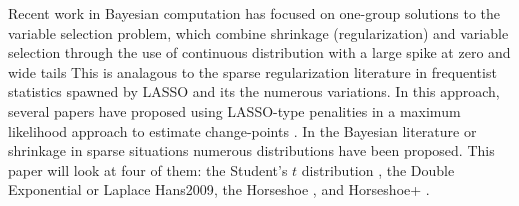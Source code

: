 Recent work in Bayesian computation has focused on one-group solutions to the variable selection problem, which combine shrinkage (regularization) and variable selection through the use of continuous distribution with a large spike at zero and wide tails \parencite{}
This is analagous to the sparse regularization literature in frequentist statistics spawned by LASSO \parencite{Tibshirani1996} and its the numerous variations.
In this approach, several papers have proposed using LASSO-type penalities in a maximum likelihood approach to estimate change-points \parencites{TibshiraniEtAl2005}{HarchaouiLevy-Leduc2010}{ChanYauZhang2014}.
In the Bayesian literature or shrinkage in sparse situations numerous distributions have been proposed. 
This paper will look at four of them: the Student's $t$ distribution \parencite{Tipping2001}, the Double Exponential or Laplace \parencite{ParkCasella2008}{Hans2009}, the Horseshoe \parencite{CarvalhoPolsonScott2010}, and Horseshoe+ \parencite{BhadraDattaPolsonEtAl2015a}.


